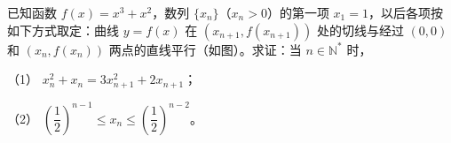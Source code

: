 \begin{question}
已知函数 $f(x)=x^3+x^2$，数列 $\{x_n\}$（$x_n>0$）的第一项 $x_1=1$，以后各项按如下方式取定：曲线 $y=f(x)$ 在 $(x_{n+1},f(x_{n+1}))$ 处的切线与经过 $(0,0)$ 和 $(x_n,f(x_n))$ 两点的直线平行（如图）。求证：当 $n\in\mathbb N^*$ 时，

（1） $x_n^2+x_n=3x_{n+1}^2+2x_{n+1}$；

（2） $\left(\dfrac12\right)^{n-1}\leqslant x_n\leqslant\left(\dfrac12\right)^{n-2}$。
\nopagebreak[4]
\begin{center}\end{center}
\nopagebreak[4]

\end{question}